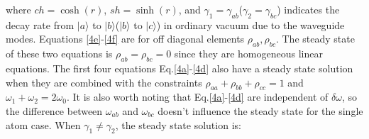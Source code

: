 \documentclass[aps,showpacs,twocolumn,twoside,groupedaddress]{revtex4}
\begin{document}
where $ch=\cosh(r)$, $sh=\sinh(r)$, and $\gamma_{1}=\gamma_{ab}$($\gamma_{2}=\gamma_{bc}$) indicates the decay rate from $|a\rangle$ to $|b\rangle$($|b\rangle$ to $|c\rangle$) in ordinary vacuum due to the waveguide modes. Equations \eqref{4e}-\eqref{4f} are for off diagonal elements $\rho_{ab}, \rho_{bc}$. The steady state of these two equations is $\rho_{ab}=\rho_{bc}=0$ since they are homogeneous linear equations. The first four equations Eq.\eqref{4a}-\eqref{4d} also have a steady state solution when they are combined with the constraints $\rho_{aa}+\rho_{bb}+\rho_{cc}=1$ and $\omega_1+\omega_2=2\omega_0$. It is also worth noting that Eq.\eqref{4a}-\eqref{4d} are independent of $\delta\omega$, so the difference between $\omega_{ab}$ and $\omega_{bc}$ doesn't influence the steady state for the single atom case. When $\gamma_1\ne\gamma_2$, the steady state solution is:
\end{document}
